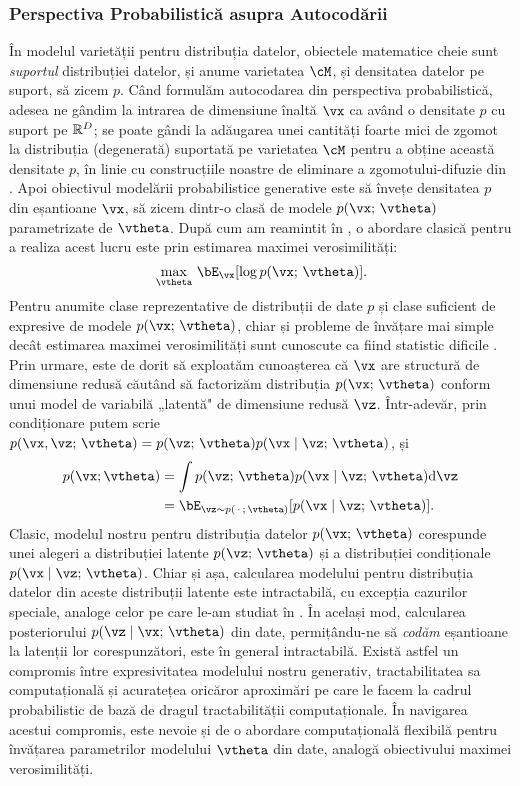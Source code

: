 \documentclass[../../book-main_ro.tex]{subfiles}
\begin{document}
\subsubsection{Perspectiva Probabilistică asupra Autocodării}
În modelul varietății pentru distribuția datelor, obiectele matematice cheie
sunt \textit{suportul} distribuției datelor, și anume varietatea $\cM$,
și densitatea datelor pe suport, să zicem $p$. Când formulăm
autocodarea din perspectiva probabilistică, adesea ne gândim la
intrarea de dimensiune înaltă $\vx$ ca având o densitate $p$ cu suport pe $\mathbb{R}^D$; se
poate gândi la adăugarea unei cantități foarte mici de zgomot la distribuția (degenerată)
suportată pe varietatea $\cM$ pentru a obține această densitate $p$, în linie
cu construcțiile noastre de eliminare a zgomotului-difuzie din .
Apoi obiectivul modelării probabilistice generative este să învețe densitatea $p$
din eșantioane $\vx$, să zicem dintr-o clasă de modele $p(\vx;\, \vtheta)$ parametrizate
de $\vtheta$. După cum am reamintit în , o abordare clasică
pentru a realiza acest lucru este prin estimarea maximei verosimilități:
\begin{equation*}\label{eq:VAE-MLE}
\max_{\vtheta}\, \bE_{\vx}[ \log p(\vx;\, \vtheta) ].
\end{equation*}
Pentru anumite clase reprezentative de distribuții de date $p$
și clase suficient de expresive de modele $p(\vx;\, \vtheta)$, chiar și probleme
de învățare mai simple decât estimarea maximei verosimilități sunt cunoscute ca fiind
statistic dificile \cite{Yang1999-wb}. Prin urmare, este de dorit să exploatăm
cunoașterea că $\vx$ are structură de dimensiune redusă căutând să factorizăm
distribuția $p(\vx ;\, \vtheta)$ conform unui model de variabilă „latentă"
de dimensiune redusă $\vz$. Într-adevăr, prin condiționare putem scrie $p(\vx,
\vz ;\, \vtheta)
= p(\vz;\, \vtheta) p(\vx \mid \vz;\, \vtheta)$, și
\begin{align*}
p(\vx; \vtheta) &= \int p(\vz;\, \vtheta) p(\vx \mid \vz;\, \vtheta) \odif \vz
\\
&=
\bE_{\vz \sim p(\,\cdot\,;\, \vtheta)}[ p(\vx \mid \vz;\, \vtheta) ].
\end{align*}
Clasic, modelul nostru pentru distribuția datelor $p(\vx;\, \vtheta)$ corespunde
unei alegeri a distribuției latente $p(\vz;\, \vtheta)$ și a distribuției
condiționale $p(\vx \mid \vz;\, \vtheta)$.
Chiar și așa, calcularea modelului pentru distribuția datelor din aceste distribuții
latente este intractabilă, cu excepția cazurilor speciale, analoge celor pe care le-am
studiat în .
În același mod, calcularea posteriorului $p(\vz \mid \vx;\, \vtheta)$ din
date, permițându-ne să \textit{codăm} eșantioane la latenții lor corespunzători, este
în general intractabilă.
Există astfel un compromis între expresivitatea modelului nostru generativ,
tractabilitatea sa computațională și acuratețea oricăror aproximări pe care le facem
la cadrul probabilistic de bază de dragul
tractabilității computaționale.
În navigarea acestui compromis, este nevoie și de o abordare computațională flexibilă
pentru învățarea parametrilor modelului $\vtheta$ din date, analogă obiectivului
maximei verosimilități.
\end{document}

